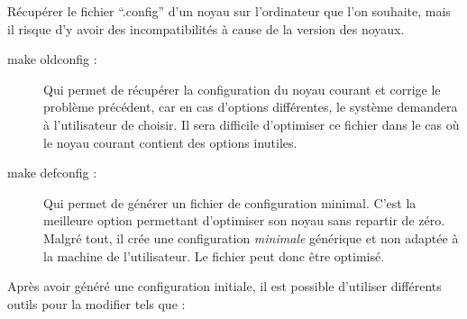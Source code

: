 \documentclass[17pts]{report}
\begin{document}
Récupérer le fichier “.config” d’un noyau sur l’ordinateur que l’on souhaite,
mais il risque d’y avoir des incompatibilités à cause de la version des noyaux.
\begin{description}
    \item[make oldconfig :] Qui permet de récupérer la configuration du noyau
        courant et corrige le problème précédent, car en cas d’options
        différentes, le système demandera à l’utilisateur de choisir. Il sera
        difficile d’optimiser ce fichier dans le cas où le noyau courant
        contient des options inutiles.
    \item[make defconfig :] Qui permet de générer un fichier de configuration
        minimal. C’est la meilleure option permettant d’optimiser son noyau
        sans repartir de zéro. Malgré tout, il crée une configuration
        \textit{minimale} générique et non adaptée à la machine de
        l’utilisateur.  Le fichier peut donc être optimisé.
\end{description}

Après avoir généré une configuration initiale, il est possible d’utiliser
différents outils pour la modifier tels que :
\end{document}
